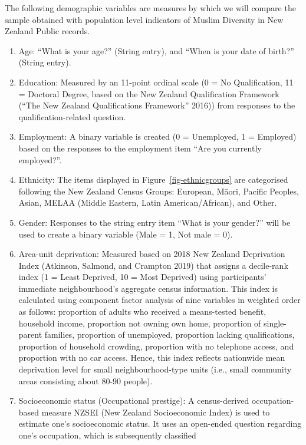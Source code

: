 \documentclass[
]{interact}
\providecommand{\tightlist}{%
  \setlength{\itemsep}{0pt}\setlength{\parskip}{0pt}}\usepackage{longtable,booktabs,array}
\begin{document}
The following demographic variables are measures by which we will
compare the sample obtained with population level indicators of Muslim
Diversity in New Zealand Public records.

\begin{enumerate}
\def\labelenumi{\arabic{enumi}.}
\tightlist
\item
  Age: ``What is your age?'' (String entry), and ``When is your date of
  birth?'' (String entry).
\item
  Education: Measured by an 11-point ordinal scale (0 = No
  Qualification, 11 = Doctoral Degree, based on the New Zealand
  Qualification Framework ({``The New Zealand Qualifications
  Framework''} 2016)) from responses to the qualification-related
  question.
\item
  Employment: A binary variable is created (0 = Unemployed, 1 =
  Employed) based on the responses to the employment item ``Are you
  currently employed?''.
\item
  Ethnicity: The items displayed in Figure~\ref{fig-ethnicgroups} are
  categorised following the New Zealand Census Groups: European, Māori,
  Pacific Peoples, Asian, MELAA (Middle Eastern, Latin
  American/African), and Other.
\item
  Gender: Responses to the string entry item ``What is your gender?''
  will be used to create a binary variable (Male = 1, Not male = 0).
\item
  Area-unit deprivation: Measured based on 2018 New Zealand Deprivation
  Index (Atkinson, Salmond, and Crampton 2019) that assigns a
  decile-rank index (1 = Least Deprived, 10 = Most Deprived) using
  participants' immediate neighbourhood's aggregate census information.
  This index is calculated using component factor analysis of nine
  variables in weighted order as follows: proportion of adults who
  received a means-tested benefit, household income, proportion not
  owning own home, proportion of single-parent families, proportion of
  unemployed, proportion lacking qualifications, proportion of household
  crowding, proportion with no telephone access, and proportion with no
  car access. Hence, this index reflects nationwide mean deprivation
  level for small neighbourhood-type units (i.e., small community areas
  consisting about 80-90 people).
\item
  Socioeconomic status (Occupational prestige): A census-derived
  occupation-based measure NZSEI (New Zealand Socioeconomic Index) is
  used to estimate one's socioeconomic status. It uses an open-ended
  question regarding one's occupation, which is subsequently classified

\end{enumerate}
\end{document}
